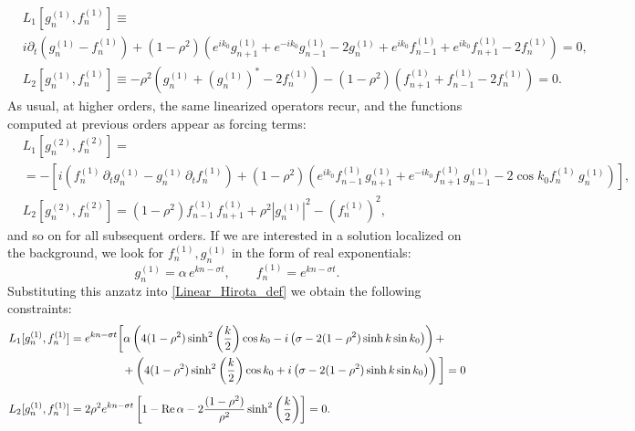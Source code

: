 \documentclass{article}
\def\Re{\mathop{\rm Re}\nolimits}
\begin{document}
\begin{subequations}
\label{Linear_Hirota_def}
\begin{align}
 & L_1[g^{(1)}_n,f^{(1)}_n]\equiv \\
&  i\partial_t(g^{(1)}_n-f^{(1)}_n)  +(1-\rho^2)\left( e^{ik_0}g^{(1)}_{n+1}+e^{-ik_0}g^{(1)}_{n-1}-2g^{(1)}_{n}+ e^{ik_0}f^{(1)}_{n-1}+e^{ik_0}f^{(1)}_{n+1}-2f^{(1)}_{n}\right)   =0,  \nonumber \\
&  L_2[g^{(1)}_n,f^{(1)}_n]\equiv -\rho^2\left(g^{(1)}_n+(g^{(1)}_n)^*-2f^{(1)}_n\right)-(1-\rho^2)\left(f^{(1)}_{n+1}+f^{(1)}_{n-1}-2f^{(1)}_{n}\right)=0.
\end{align}
\end{subequations}
As usual, at higher orders, the same linearized operators recur, and the functions computed at previous orders appear as forcing terms:
\begin{subequations}
\begin{align}
  &L_1[g^{(2)}_n,f^{(2)}_n]= \\
  &=-\left[i\left(f^{(1)}_n\,\partial_t g^{(1)}_n-g^{(1)}_n\,\partial_t f^{(1)}_n\right)+(1-\rho^2)\left(e^{i k_0}f^{(1)}_{n-1}\,g^{(1)}_{n+1}+e^{-i k_0}f^{(1)}_{n+1}\,g^{(1)}_{n-1}-2\cos k_0 f^{(1)}_{n}\,g^{(1)}_{n}\right)\right], \nonumber \\
  &L_2[g^{(2)}_n,f^{(2)}_n]=(1-\rho^2)f^{(1)}_{n-1}\,f^{(1)}_{n+1}+\rho^2|g^{(1)}_{n}|^2-\left(f^{(1)}_{n}\right)^2,
\end{align}
\end{subequations}
and so on for all subsequent orders. If we are interested in a solution localized on the background, we look for $f^{(1)}_n,g^{(1)}_n$ in the form of real exponentials:
\begin{equation}\label{linear_Hirota_def}
    g^{(1)}_n=\alpha \,e^{k n-\sigma t}, \qquad f^{(1)}_n=e^{k n-\sigma t}.
\end{equation}
Substituting this anzatz into \eqref{Linear_Hirota_def} we obtain the following constraints:
\begin{equation}
\begin{split}
    &L_1[g_n^{(1)},f_n^{(1)}]=e^{kn-\sigma t}\bigg[ \alpha\left(4(1-\rho^2)\sinh^2\left(\frac{k}{2}\right)\cos k_0-i\left(\sigma-2(1-\rho^2)\sinh k \sin k_0\right)\right)+ \\
    &\   \ \ \ \  \  \ \ \ \ \ \ \  \  \ \ \ \  \  \  \  \  \  \   \   \  \ \  \ \ +\left(4(1-\rho^2)\sinh^2\left(\frac{k}{2}\right)\cos k_0+i\left(\sigma-2(1-\rho^2)\sinh k \sin k_0\right)\right) \bigg] =0\\[2mm]
   & L_2[g_n^{(1)},f_n^{(1)}]=2\rho^2e^{kn-\sigma t}\left[ 1-\Re \alpha-2\frac{(1-\rho^2)}{\rho^2}\sinh^2 \left(\frac{k}{2}\right) \right]=0.
  \end{split}  
\end{equation}
\end{document}
